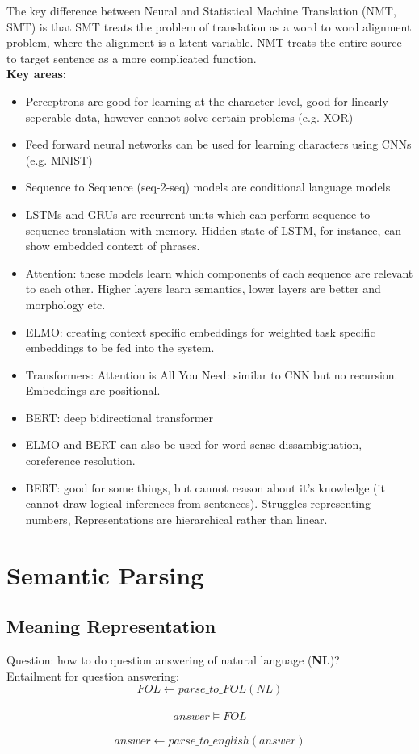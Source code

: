 \documentclass[]{article}
\begin{document}
	The key difference between Neural and Statistical Machine Translation (NMT, SMT) is that SMT treats the problem of translation as a word to word alignment problem, where the alignment is a latent variable. NMT treats the entire source to target sentence as a more complicated function. \\
	
	\textbf{Key areas:}
	\begin{itemize}
	 \item Perceptrons are good for learning at the character level, good for linearly seperable data, however cannot solve certain problems (e.g. XOR)
	 \item Feed forward neural networks can be used for learning characters using CNNs (e.g. MNIST)
	 \item Sequence to Sequence (seq-2-seq) models are conditional language models
	 \item LSTMs and GRUs are recurrent units which can perform sequence to sequence translation with memory. Hidden state of LSTM, for instance, can show embedded context of phrases.
	 \item Attention: these models learn which components of each sequence are relevant to each other. Higher layers learn semantics, lower layers are better and morphology etc.
	 \item ELMO: creating context specific embeddings for weighted task specific embeddings to be fed into the system. 
	 \item Transformers: Attention is All You Need: similar to CNN but no recursion. Embeddings are positional. 
	 \item BERT: deep bidirectional transformer
	 \item ELMO and BERT can also be used for word sense dissambiguation, coreference resolution.
	 \item BERT: good for some things, but cannot reason about it's knowledge (it cannot draw logical inferences from sentences). Struggles representing numbers, Representations are hierarchical rather than linear.
	\end{itemize}

	
	\clearpage 
	\section{Semantic Parsing}
	
	\subsection{Meaning Representation}
	Question: how to do question answering of natural language (\textbf{NL})? \\
	Entailment for question answering: $$FOL \gets parse\_to\_FOL(NL) $$ \\
              $$ answer \models FOL $$ \\
              $$ answer \gets parse\_to\_english(answer) $$ \\
              
\end{document}
